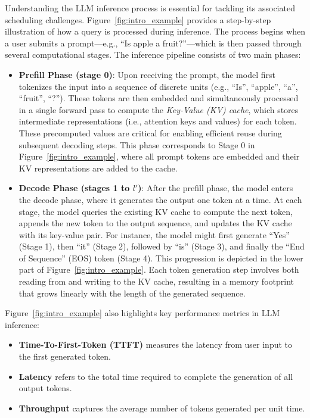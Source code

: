 Understanding the LLM inference process is essential for tackling its associated scheduling challenges. Figure~\ref{fig:intro_example} provides a step-by-step illustration of how a query is processed during inference. The process begins when a user submits a prompt—e.g., ``Is apple a fruit?''—which is then passed through several computational stages. The inference pipeline consists of two main phases:
\begin{itemize}
    \item \textbf{Prefill Phase (stage 0)}: Upon receiving the prompt, the model first tokenizes the input into a sequence of discrete units (e.g., ``Is'', ``apple'', ``a'', ``fruit'', ``?''). These tokens are then embedded and simultaneously processed in a single forward pass to compute the \textit{Key-Value (KV) cache}, which stores intermediate representations (i.e., attention keys and values) for each token. These precomputed values are critical for enabling efficient reuse during subsequent decoding steps. This phase corresponds to Stage 0 in Figure~\ref{fig:intro_example}, where all prompt tokens are embedded and their KV representations are added to the cache.

    \item \textbf{Decode Phase (stages 1 to \( l' \))}: After the prefill phase, the model enters the decode phase, where it generates the output one token at a time. At each stage, the model queries the existing KV cache to compute the next token, appends the new token to the output sequence, and updates the KV cache with its key-value pair. For instance, the model might first generate ``Yes'' (Stage 1), then ``it'' (Stage 2), followed by ``is'' (Stage 3), and finally the ``End of Sequence'' (EOS) token (Stage 4). This progression is depicted in the lower part of Figure~\ref{fig:intro_example}. Each token generation step involves both reading from and writing to the KV cache, resulting in a memory footprint that grows linearly with the length of the generated sequence.
\end{itemize}

Figure~\ref{fig:intro_example} also highlights key performance metrics in LLM inference:
\begin{itemize}
    \item \textbf{Time-To-First-Token (TTFT)} measures the latency from user input to the first generated token.
    \item \textbf{Latency} refers to the total time required to complete the generation of all output tokens.
    \item \textbf{Throughput} captures the average number of tokens generated per unit time.
\end{itemize}

